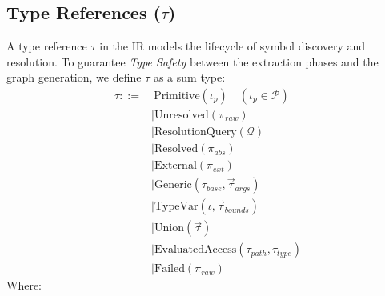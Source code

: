 \subsection{Type References ($\tau$)}
A type reference $\tau$ in the IR models the lifecycle of symbol
discovery and resolution. To guarantee \textit{Type Safety} between
the extraction phases and the graph generation, we define $\tau$ as
a sum type:
\begin{align*}
  \tau ::=&\ \text{Primitive}(\iota_p) \quad (\iota_p \in \mathcal{P}) \\
  &\mid \text{Unresolved}(\pi_{raw}) \\
  &\mid \text{ResolutionQuery}(\mathcal{Q}) \\
  &\mid \text{Resolved}(\pi_{abs}) \\
  &\mid \text{External}(\pi_{ext}) \\
  &\mid \text{Generic}(\tau_{base}, \vec{\tau}_{args}) \\
  &\mid \text{TypeVar}(\iota, \vec{\tau}_{bounds}) \\
  &\mid \text{Union}(\vec{\tau}) \\
  &\mid \text{EvaluatedAccess}(\tau_{path}, \tau_{type}) \\
  &\mid \text{Failed}(\pi_{raw})
\end{align*}
Where:
